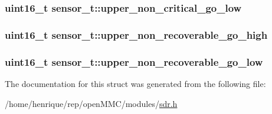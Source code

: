 \hypertarget{structsensor__t_a9348f81c165dbfc83b26377082ddc5fa}{
\subsubsection[{upper\-\_\-non\-\_\-critical\-\_\-go\-\_\-low}]{\setlength{\rightskip}{0pt plus 5cm}uint16\-\_\-t sensor\-\_\-t\-::upper\-\_\-non\-\_\-critical\-\_\-go\-\_\-low}}\label{structsensor__t_a9348f81c165dbfc83b26377082ddc5fa}
\hypertarget{structsensor__t_a3456e5e9d1f05ca2a1ccd7c572e4190a}{
\subsubsection[{upper\-\_\-non\-\_\-recoverable\-\_\-go\-\_\-high}]{\setlength{\rightskip}{0pt plus 5cm}uint16\-\_\-t sensor\-\_\-t\-::upper\-\_\-non\-\_\-recoverable\-\_\-go\-\_\-high}}\label{structsensor__t_a3456e5e9d1f05ca2a1ccd7c572e4190a}
\hypertarget{structsensor__t_a970d0c47571b67b82ce142c09f3e4cd1}{
\subsubsection[{upper\-\_\-non\-\_\-recoverable\-\_\-go\-\_\-low}]{\setlength{\rightskip}{0pt plus 5cm}uint16\-\_\-t sensor\-\_\-t\-::upper\-\_\-non\-\_\-recoverable\-\_\-go\-\_\-low}}\label{structsensor__t_a970d0c47571b67b82ce142c09f3e4cd1}


The documentation for this struct was generated from the following file\-:\begin{DoxyCompactItemize}
\item 
/home/henrique/rep/open\-M\-M\-C/modules/\hyperlink{sdr_8h}{sdr.\-h}\end{DoxyCompactItemize}

